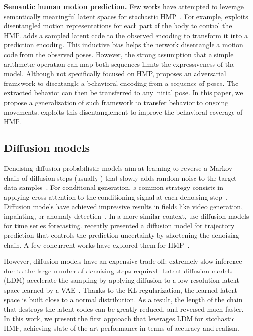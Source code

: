 \documentclass[10pt,twocolumn,letterpaper]{article}
\begin{document}
\textbf{Semantic human motion prediction. } 
Few works have attempted to leverage semantically meaningful latent spaces for stochastic HMP~\cite{yan2018mtvae, liu2021aggregated, gu2022learning}. For example, \cite{gu2022learning} exploits disentangled motion representations for each part of the body to control the HMP. \cite{yan2018mtvae} adds a sampled latent code to the observed encoding to transform it into a prediction encoding. This inductive bias helps the network disentangle a motion code from the observed poses. However, the strong assumption that a simple arithmetic operation can map both sequences limits the expressiveness of the model. Although not specifically focused on HMP, \cite{blattmann2021behavior} proposes an adversarial framework to disentangle a behavioral encoding from a sequence of poses. The extracted behavior can then be transferred to any initial pose. In this paper, we propose a generalization of such framework to transfer behavior to ongoing movements. \modelname{} exploits this disentanglement to improve the behavioral coverage of HMP.

\subsection{Diffusion models}


Denoising diffusion probabilistic models aim at learning to reverse a Markov chain of  diffusion steps (usually ) that slowly adds random noise to the target data samples~\cite{sohl2015deep, ho2020denoising}. 
For conditional generation, a common strategy consists in applying cross-attention to the conditioning signal at each denoising step~\cite{dhariwal2021diffusionbeatsgans}. 
Diffusion models have achieved impressive results in fields like video generation, inpainting, or anomaly detection~\cite{yang2022diffusionsurvey}. In a more similar context, \cite{rasul2021timegrad, tashiro2021csdi} use diffusion models for time series forecasting. \cite{gu2022stochastic} recently presented a diffusion model for trajectory prediction that controls the prediction uncertainty by shortening the denoising chain. A few concurrent works have explored them for HMP~\cite{saadatnejad2023generic, wei2023human, chen2023humanmac, ahn2023can, chen2023executing}.

However, diffusion models have an expensive trade-off: extremely slow inference due to the large number of denoising steps required. Latent diffusion models (LDM) accelerate the sampling by applying diffusion to a low-resolution latent space learned by a VAE~\cite{vahdat2021score, rombach2022high}. Thanks to the KL regularization, the learned latent space is built close to a normal distribution. As a result, the length of the chain that destroys the latent codes can be greatly reduced, and reversed much faster. In this work, we present the first approach that leverages LDM for stochastic HMP, achieving state-of-the-art performance in terms of accuracy and realism. 
\def\obsT{B}
\def\predT{T}
\def\xmotion{\mathbf{x}_{m}}
\def\obs{\mathbf{X}}
\def\pred{\mathbf{Y}}
\end{document}
